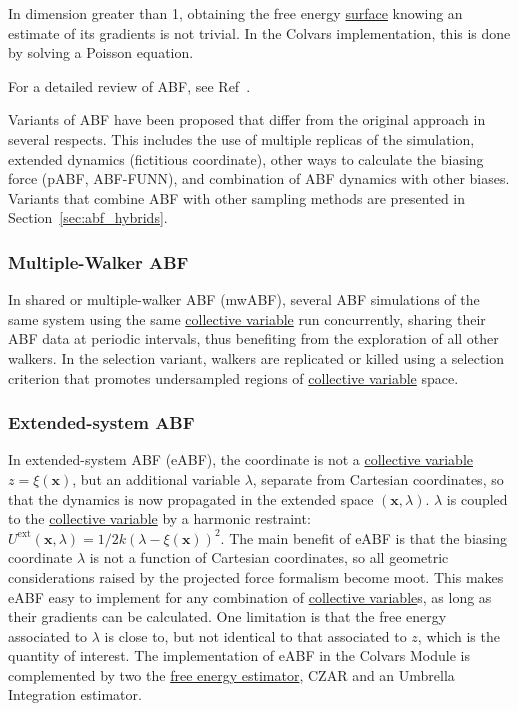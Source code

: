 \documentclass[9pt,review]{livecoms}
\newcommand{\vx}{\mathbf{x}}
\begin{document}
In dimension greater than 1, obtaining the free energy \hyperlink{ref:FES} {surface} knowing an estimate of its gradients is not trivial.
In the Colvars implementation, this is done by solving a Poisson equation\cite{Lelievre2010, Alrachid2015, Henin2021integration}.

For a detailed review of ABF, see Ref~\cite{Comer2015}.

Variants of ABF have been proposed that differ from the original approach in several respects.
This includes the use of multiple replicas of the simulation, extended dynamics (fictitious coordinate), other ways to calculate the biasing force (pABF, ABF-FUNN), and combination of ABF dynamics with other biases.
Variants that combine ABF with other sampling methods are presented in Section~\ref{sec:abf_hybrids}.

\subsubsection{Multiple-Walker ABF}
\label{sec:mwABF}

In shared or multiple-walker ABF (mwABF),\cite{Lelievre2007, Minoukadeh2010, Comer2014mwABF} several ABF simulations of the same system using the same \hyperlink{ref:CV} {collective variable} run concurrently, sharing their ABF data at periodic intervals, thus benefiting from the exploration of all other walkers.
In the selection variant,\cite{Minoukadeh2010, Comer2014mwABF} walkers are replicated or killed using a selection criterion that promotes undersampled regions of \hyperlink{ref:CV} {collective variable} space.

\subsubsection{Extended-system ABF}
\label{sec:eABF}

In extended-system ABF (eABF),\cite{Lelievre2010eABF, Zheng2012} the coordinate is not a \hyperlink{ref:CV} {collective variable} $z = \xi(\vx)$, but an additional variable $\lambda$, separate from Cartesian coordinates, so that the dynamics is now propagated in the extended space $(\vx, \lambda)$.
$\lambda$ is coupled to the \hyperlink{ref:CV} {collective variable} by a harmonic restraint: $U^\mathrm{ext}(\vx, \lambda) = 1/2 k (\lambda - \xi(\vx))^2$.
The main benefit of eABF is that the biasing coordinate $\lambda$ is not a function of Cartesian coordinates, so all geometric considerations raised by the projected force formalism become moot. This makes eABF easy to implement for any combination of \hyperlink{ref:CV} {collective variable}s, as long as their gradients can be calculated.
One limitation is that the free energy associated to $\lambda$ is close to, but not identical to that associated to $z$, which is the quantity of interest.
The implementation of eABF in the Colvars Module\cite{Lesage2017} is complemented by two the \hyperlink{ref:FEestimator} {free energy estimator}, CZAR\cite{Lesage2017} and an Umbrella Integration estimator.\cite{Kastner2005, Zheng2012, Fu2016}
\end{document}
